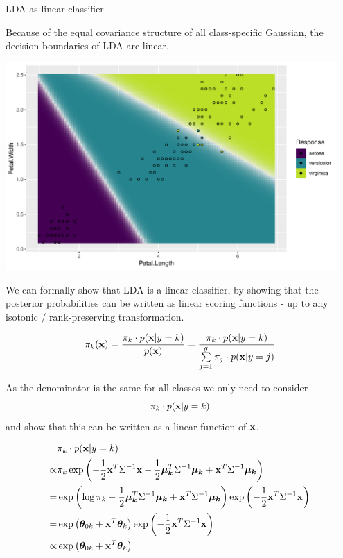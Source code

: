\documentclass[11pt,compress,t,notes=noshow, xcolor=table]{beamer}
\begin{document}
\begin{vbframe}{LDA as linear classifier}

  Because of the equal covariance structure of all class-specific Gaussian, the decision boundaries
  of LDA are linear.

\scriptsize
{}\color{fgcolor}

{\centering \includegraphics[width=0.95\textwidth]{figure/reg_class_dis_2}

}





\framebreak


We can formally show that LDA is a linear classifier, by showing that the posterior probabilities
can be written as linear scoring functions - up to any isotonic / rank-preserving transformation.

$$
  \pikx = \frac{\pik \cdot \pdfxyk }{\pdfx} = \frac{\pik \cdot \pdfxyk}{\sumjg \pi_j \cdot \pdfxyk[j]}
$$

As the denominator is the same for all classes we only need to consider
$$\pik \cdot \pdfxyk$$
and show that this can be written as a linear function of $\xv$.

\framebreak


\begin{eqnarray*}
& \pik \cdot \pdfxyk \\
  \propto& \pik \exp\left(- \frac{1}{2} \xv^T\Sigma^{-1}\xv - \frac{1}{2} \muk^T \Sigma^{-1} \muk + \xv^T \Sigma^{-1} \muk \right) \\
=& \exp\left(\log \pik  - \frac{1}{2} \muk^T \Sigma^{-1} \muk + \xv^T \Sigma^{-1} \muk \right) \exp\left(- \frac{1}{2} \xv^T\Sigma^{-1}\xv\right) \\
=& \exp\left(\thetab_{0k} + \xv^T \thetab_k\right) \exp\left(- \frac{1}{2} \xv^T\Sigma^{-1}\xv\right)\\
\propto& \exp\left(\thetab_{0k} + \xv^T \thetab_k\right)
\end{eqnarray*}


\end{vbframe}
\end{document}
